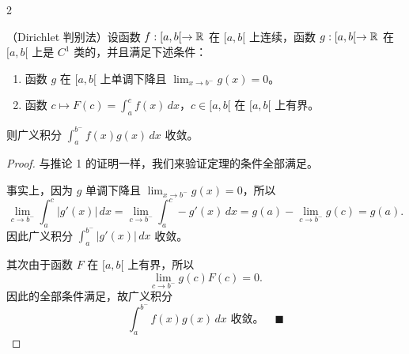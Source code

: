 \begin{mycor*}{2}

（Dirichlet 判别法）设函数 $f:[a,b[\to\mathbb{R}$ 在 $[a,b[$ 上连续，函数 $g:[a,b[\to\mathbb{R}$ 在 $[a,b[$ 上是 $C^1$ 类的，并且满足下述条件：

\begin{enumerate}[label=\arabic{enumi})]
\item 函数 $g$ 在 $[a,b[$ 上单调下降且 $\displaystyle\lim_{x\to b^-}g(x)=0$。
\item 函数 $c\longmapsto F(c)=\displaystyle\int_a^cf(x)\,dx$，$c\in[a,b[$ 在 $[a,b[$ 上有界。
\end{enumerate}

则广义积分 $\displaystyle\int_a^{b^-}f(x)g(x)\,dx$ 收敛。

\end{mycor*}

\begin{proof}

与推论 1 的证明一样，我们来验证定理的条件全部满足。

事实上，因为 $g$ 单调下降且 $\displaystyle\lim_{x\to b^-}g(x)=0$，所以
\[\lim_{c\to b^-}\int_a^c|g'(x)|\,dx=\lim_{c\to b^-}\int_a^c-g'(x)\,dx=g(a)-\lim_{c\to b^-}g(c)=g(a).\]
因此广义积分 $\displaystyle\int_a^{b^-}|g'(x)|\,dx$ 收敛。

其次由于函数 $F$ 在 $[a,b[$ 上有界，所以
\[\lim_{c\to b^-}g(c)F(c)=0.\]
因此的全部条件满足，故广义积分
\[\int_a^{b^-}f(x)g(x)\,dx\text{ 收敛。}\quad\blacksquare\]

\end{proof}

